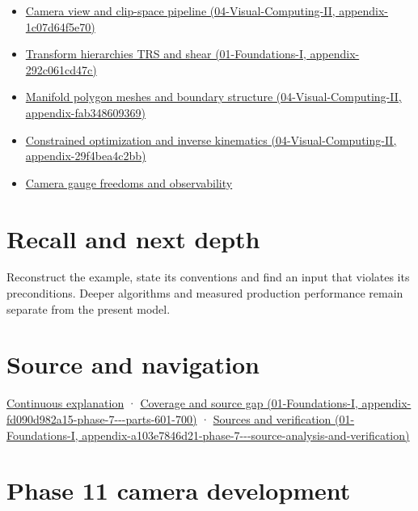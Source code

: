 \begin{itemize}
\item
  \href{../04-Visual-Computing-II/main.pdf\#nameddest=appendix-1c07d64f5e70}{Camera view and clip-space pipeline (04-Visual-Computing-II, appendix-1c07d64f5e70)}
\item
  \href{../01-Foundations-I/main.pdf\#nameddest=appendix-292c061cd47c}{Transform hierarchies TRS and shear (01-Foundations-I, appendix-292c061cd47c)}
\item
  \href{../04-Visual-Computing-II/main.pdf\#nameddest=appendix-fab348609369}{Manifold polygon meshes and boundary structure (04-Visual-Computing-II, appendix-fab348609369)}
\item
  \href{../04-Visual-Computing-II/main.pdf\#nameddest=appendix-29f4bea4c2bb}{Constrained optimization and inverse kinematics (04-Visual-Computing-II, appendix-29f4bea4c2bb)}
\item
  \hyperref[appendix-113f0267e5f4]{Camera gauge freedoms and observability}
\end{itemize}

\section{Recall and next depth}\label{appendix-1bae9457dbc3-recall-and-next-depth}

Reconstruct the example, state its conventions and find an input that violates its preconditions. Deeper algorithms and measured production performance remain separate from the present model.

\section{Source and navigation}\label{appendix-1bae9457dbc3-source-and-navigation}

\href{Continuous\%20Notes/Computing\%20Foundations\%20-\%20From\%20Bits\%20to\%20C++\%20and\%20Systems\%20APIs\#Keep\%20the\%20promises\%20visible\%20while\%20moving\%20between\%20representations}{Continuous explanation} · \href{../01-Foundations-I/main.pdf\#nameddest=appendix-fd090d982a15-phase-7---parts-601-700}{Coverage and source gap (01-Foundations-I, appendix-fd090d982a15-phase-7-\/-\/-parts-601-700)} · \href{../01-Foundations-I/main.pdf\#nameddest=appendix-a103e7846d21-phase-7---source-analysis-and-verification}{Sources and verification (01-Foundations-I, appendix-a103e7846d21-phase-7-\/-\/-source-analysis-and-verification)}

\section{Phase 11 camera development}\label{appendix-1bae9457dbc3-phase-11-camera-development}

